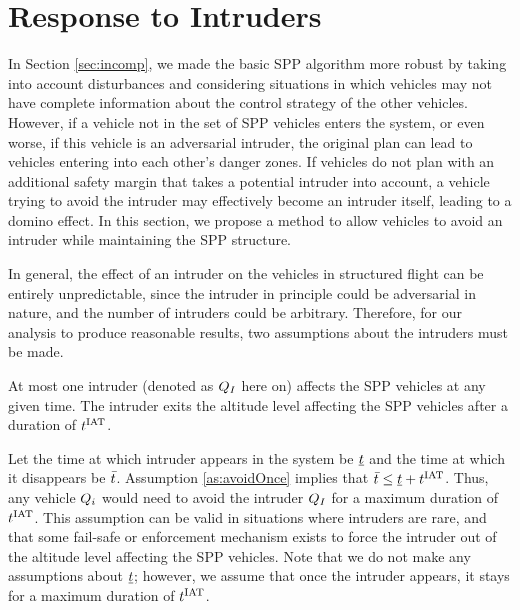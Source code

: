 \section{Response to Intruders \label{sec:intruder}}

In Section \ref{sec:incomp}, we made the basic SPP algorithm more robust by taking into account disturbances and considering situations in which vehicles may not have complete information about the control strategy of the other vehicles. However, if a vehicle not in the set of SPP vehicles enters the system, or even worse, if this vehicle is an adversarial intruder, the original plan can lead to vehicles entering into each other's danger zones. If vehicles do not plan with an additional safety margin that takes a potential intruder into account, a vehicle trying to avoid the intruder may effectively become an intruder itself, leading to a domino effect. In this section, we propose a method to allow vehicles to avoid an intruder while maintaining the SPP structure.

In general, the effect of an intruder on the vehicles in structured flight can be entirely unpredictable, since the intruder in principle could be adversarial in nature, and the number of intruders could be arbitrary. Therefore, for our analysis to produce reasonable results, two assumptions about the intruders must be made.

\begin{assumption}
\label{as:avoidOnce}
At most one intruder (denoted as $Q_I$ here on) affects the SPP vehicles at any given time. The intruder exits the altitude level affecting the SPP vehicles after a duration of $t^\text{IAT}$. 
\end{assumption}

Let the time at which intruder appears in the system be $\underline{t}$ and the time at which it disappears be $\bar{t}$. Assumption \ref{as:avoidOnce} implies that $\bar{t} \leq \underline{t} + t^\text{IAT}$. Thus, any vehicle $Q_i$ would need to avoid the intruder $Q_{I}$ for a maximum duration of $t^\text{IAT}$. This assumption can be valid in situations where intruders are rare, and that some fail-safe or enforcement mechanism exists to force the intruder out of the altitude level affecting the SPP vehicles. Note that we do not make any assumptions about $\underline{t}$; however, we assume that once the intruder appears, it stays for a maximum duration of $t^\text{IAT}$.

